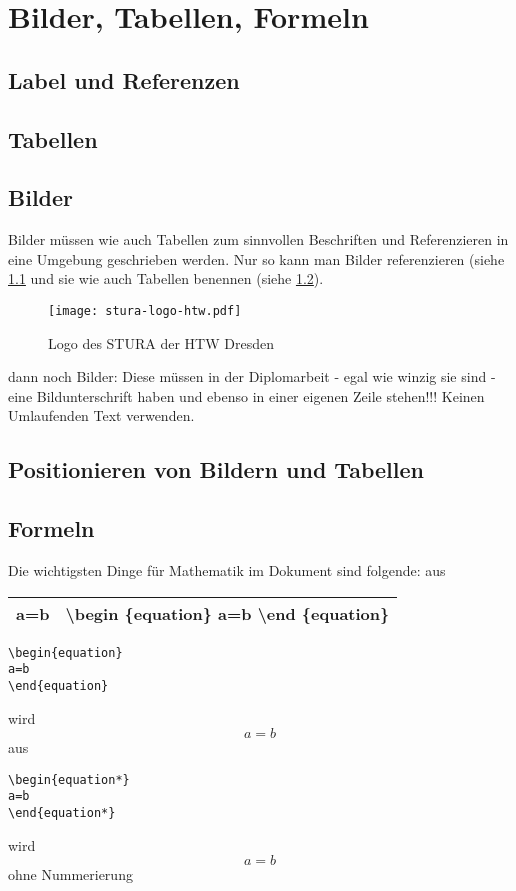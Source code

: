 \chapter{Bilder, Tabellen, Formeln}%
%
%
\section{Label und Referenzen}%
\label{sec: labandref}%
%
%
\section{Tabellen}%
\label{sec: tables}%
%
%
\section{Bilder}%
Bilder müssen wie auch Tabellen zum sinnvollen Beschriften und Referenzieren in eine Umgebung geschrieben werden. Nur so kann man Bilder referenzieren (siehe \ref{sec: labandref} und sie wie auch Tabellen benennen (siehe \ref{sec: tables}).\\%

\begin{figure}[h]%
    \texttt{[image: stura-logo-htw.pdf]}%
    \caption{Logo des STURA der HTW Dresden}%
    \label{fig: stura-logo}%
\end{figure}%
dann noch Bilder:
Diese müssen in der Diplomarbeit - egal wie winzig sie sind - eine Bildunterschrift haben und ebenso in einer eigenen Zeile stehen!!! Keinen Umlaufenden Text verwenden.
%
%
\section{Positionieren von Bildern und Tabellen}%
\section{Formeln}%
Die wichtigsten Dinge für Mathematik im Dokument sind folgende:
aus\\
\begin{tabular}[h]{cc}
\hline 
 a=b  & \textbackslash begin \{equation\} a=b \textbackslash end \{equation\} \\ 
\hline 
\end{tabular} 

\begin{lstlisting}
\begin{equation}
a=b
\end{equation}
\end{lstlisting} 
wird
\begin{equation}
a=b
\end{equation}
aus 
\begin{lstlisting}
\begin{equation*}
a=b
\end{equation*}
\end{lstlisting}
wird
\begin{equation*}
a=b
\end{equation*}
ohne Nummerierung

